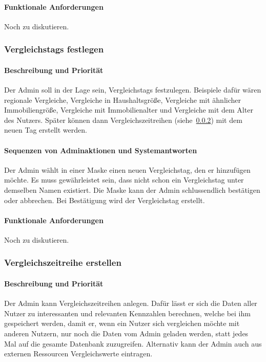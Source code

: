 \paragraph{Funktionale Anforderungen}
Noch zu diskutieren.



\subsubsection{Vergleichstags festlegen}\label{sec:vergl_tags}
\paragraph{Beschreibung und Priorität}
Der Admin soll in der Lage sein, Vergleichstags festzulegen.
Beispiele dafür wären regionale Vergleiche, Vergleiche in Haushaltsgröße, Vergleiche mit ähnlicher Immobiliengröße,
Vergleiche mit Immobilienalter und Vergleiche mit dem Alter des Nutzers.
Später können dann Vergleichszeitreihen (siehe~\ref{sec:vergl_zeitr}) mit dem neuen Tag erstellt werden.
\paragraph{Sequenzen von Adminaktionen und Systemantworten}

Der Admin wählt in einer Maske einen neuen Vergleichstag, den er hinzufügen möchte.
Es muss gewährleistet sein, dass nicht schon ein Vergleichstag unter demselben Namen existiert.
Die Maske kann der Admin schlussendlich bestätigen oder abbrechen.
Bei Bestätigung wird der Vergleichstag erstellt.
\paragraph{Funktionale Anforderungen}
Noch zu diskutieren.


\subsubsection{Vergleichszeitreihe erstellen}\label{sec:vergl_zeitr}
\paragraph{Beschreibung und Priorität}
Der Admin kann Vergleichszeitreihen anlegen.
Dafür lässt er sich die Daten aller Nutzer zu interessanten und relevanten
Kennzahlen berechnen, welche bei ihm gespeichert werden,
damit er, wenn ein Nutzer sich vergleichen möchte mit anderen Nutzern,
nur noch die Daten vom Admin geladen werden, statt jedes Mal auf die gesamte Datenbank zuzugreifen.
Alternativ kann der Admin auch aus externen Ressourcen Vergleichswerte eintragen.

